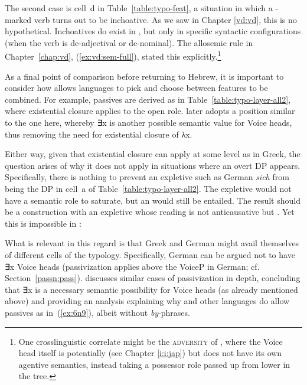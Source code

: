 \begin{exe}
\begin{xlist}
\begin{exe}
\begin{exe}
\begin{xlist}
\begin{exe}
\begin{exe}
\begin{exe}
\begin{exe}
\begin{exe}
\begin{xlist}
The second case is cell~d in Table~\ref{table:typo-feat}, a situation in which a -marked verb turns out to be inchoative. As we saw in Chapter \ref{vd:vd}, this is no hypothetical. Inchoatives do exist in {\thif}, but only in specific syntactic configurations (when the verb is de-adjectival or de-nominal). The allosemic rule in Chapter~\ref{chap:vd}, (\ref{ex:vd:sem-full}), stated this explicitly.\footnote{One crosslinguistic correlate might be the \textsc{adversity } of  \citep{pylkkanen08,woodmarantz17}, where the Voice head itself is potentially {\vd} (see Chapter \ref{i:i:jap}) but does not have its own agentive semantics, instead taking a possessor role passed up from lower in the tree.}

As a final point of comparison before returning to Hebrew, it is important to consider how  allows languages to pick and choose between features to be combined. For example,  passives are derived as in Table~\ref{table:typo-layer-all2}, where existential closure applies to the open  role. \cite{schaefer17oup} later adopts a position similar to the one here, whereby ∃x is another possible semantic value for Voice heads, thus removing the need for existential closure of λx. 

Either way, given that existential closure can apply at some level as in Greek, the question arises of why it does not apply in situations where an overt DP appears. Specifically, there is nothing to prevent an expletive such as German \emph{sich} from being the DP in cell~a of Table~\ref{table:typo-layer-all2}. The expletive would not have a semantic role to saturate, but an  would still be entailed. The result should be a construction with an expletive whose reading is not anticausative but . Yet this is impossible in :
 \begin{exe}
	
 \z 

What is relevant in this regard is that Greek and German might avail themselves of different cells of the typology. Specifically, German can be argued not to have ∃x Voice heads (passivization applies above the VoiceP in German; cf. Section~\ref{passn:pass}). \cite{schaefer17oup} discusses similar cases of passivization in depth, concluding that ∃x is a necessary semantic possibility for Voice heads (as already mentioned above) and providing an analysis explaining why  and other languages do allow passives as in~(\ref{ex:6n9}), albeit without \emph{by}-phrases. 


\end{exe}
\end{xlist}
\end{exe}
\end{exe}
\end{exe}
\end{exe}
\end{exe}
\end{xlist}
\end{exe}
\end{exe}
\end{xlist}
\end{exe}
